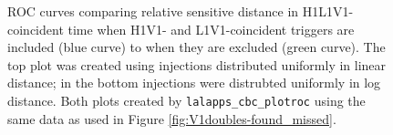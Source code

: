 \begin{figure}[p]
\center
{}
\label{fig:V1doubles-roc}
\caption{ROC curves comparing relative sensitive distance in H1L1V1-coincident
time when H1V1- and L1V1-coincident triggers are included (blue curve) to when
they are excluded (green curve). The top plot was created using injections
distributed uniformly in linear distance; in the bottom injections were
distrubted uniformly in log distance. Both plots created by
\texttt{lalapps\_cbc\_plotroc} using the same data as used in Figure
\ref{fig:V1doubles-found_missed}.}
\end{figure}



